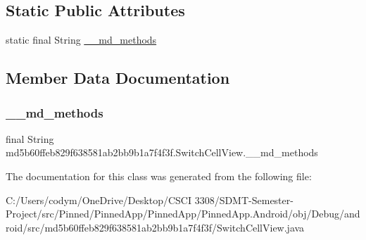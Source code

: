 \subsection*{Static Public Attributes}
\begin{DoxyCompactItemize}
\item 
static final String \hyperlink{classmd5b60ffeb829f638581ab2bb9b1a7f4f3f_1_1_switch_cell_view_a1153176f1114dedfcdc6c831e33adfea}{\+\_\+\+\_\+md\+\_\+methods}
\end{DoxyCompactItemize}


\subsection{Member Data Documentation}
\mbox{\label{classmd5b60ffeb829f638581ab2bb9b1a7f4f3f_1_1_switch_cell_view_a1153176f1114dedfcdc6c831e33adfea}} 
\subsubsection{\texorpdfstring{\+\_\+\+\_\+md\+\_\+methods}{\_\_md\_methods}}
{\footnotesize\ttfamily final String md5b60ffeb829f638581ab2bb9b1a7f4f3f.\+Switch\+Cell\+View.\+\_\+\+\_\+md\+\_\+methods\hspace{0.3cm}{\ttfamily [static]}}



The documentation for this class was generated from the following file\+:\begin{DoxyCompactItemize}
\item 
C\+:/\+Users/codym/\+One\+Drive/\+Desktop/\+C\+S\+C\+I 3308/\+S\+D\+M\+T-\/\+Semester-\/\+Project/src/\+Pinned/\+Pinned\+App/\+Pinned\+App/\+Pinned\+App.\+Android/obj/\+Debug/android/src/md5b60ffeb829f638581ab2bb9b1a7f4f3f/Switch\+Cell\+View.\+java\end{DoxyCompactItemize}
